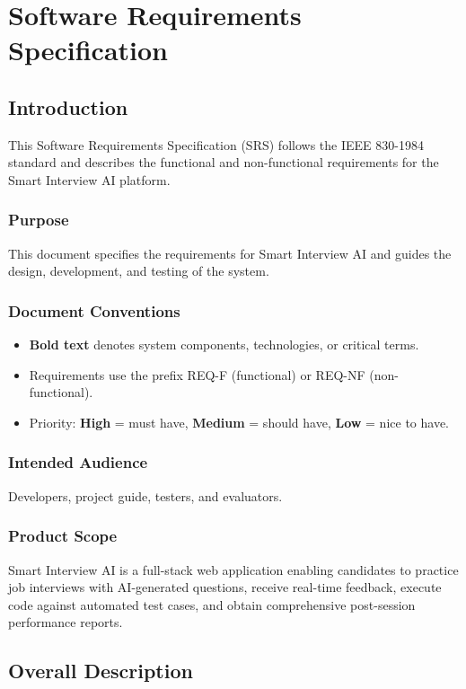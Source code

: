 \chapter{Software Requirements Specification}

\section{Introduction}

This Software Requirements Specification (SRS) follows the IEEE 830-1984 standard \cite{IEEE_srs} and describes the functional and non-functional requirements for the Smart Interview AI platform.

\subsection*{Purpose}
This document specifies the requirements for Smart Interview AI and guides the design, development, and testing of the system.

\subsection*{Document Conventions}
\begin{itemize}
  \item \textbf{Bold text} denotes system components, technologies, or critical terms.
  \item Requirements use the prefix REQ-F (functional) or REQ-NF (non-functional).
  \item Priority: \textbf{High} = must have, \textbf{Medium} = should have, \textbf{Low} = nice to have.
\end{itemize}

\subsection*{Intended Audience}
Developers, project guide, testers, and evaluators.

\subsection*{Product Scope}
Smart Interview AI is a full-stack web application enabling candidates to practice job interviews with AI-generated questions, receive real-time feedback, execute code against automated test cases, and obtain comprehensive post-session performance reports.

\section{Overall Description}

